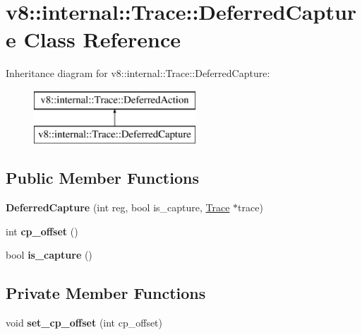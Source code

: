 \hypertarget{classv8_1_1internal_1_1_trace_1_1_deferred_capture}{}\section{v8\+:\+:internal\+:\+:Trace\+:\+:Deferred\+Capture Class Reference}
\label{classv8_1_1internal_1_1_trace_1_1_deferred_capture}
Inheritance diagram for v8\+:\+:internal\+:\+:Trace\+:\+:Deferred\+Capture\+:\begin{figure}[H]
\begin{center}
\leavevmode
\includegraphics[height=2.000000cm]{classv8_1_1internal_1_1_trace_1_1_deferred_capture}
\end{center}
\end{figure}
\subsection*{Public Member Functions}
\begin{DoxyCompactItemize}
\item 
{\bfseries Deferred\+Capture} (int reg, bool is\+\_\+capture, \hyperlink{classv8_1_1internal_1_1_trace}{Trace} $\ast$trace)\hypertarget{classv8_1_1internal_1_1_trace_1_1_deferred_capture_a20de459c31ae73a99b96e89a0364337f}{}\label{classv8_1_1internal_1_1_trace_1_1_deferred_capture_a20de459c31ae73a99b96e89a0364337f}

\item 
int {\bfseries cp\+\_\+offset} ()\hypertarget{classv8_1_1internal_1_1_trace_1_1_deferred_capture_ada13388019075f6a61a6da2cdfb617ad}{}\label{classv8_1_1internal_1_1_trace_1_1_deferred_capture_ada13388019075f6a61a6da2cdfb617ad}

\item 
bool {\bfseries is\+\_\+capture} ()\hypertarget{classv8_1_1internal_1_1_trace_1_1_deferred_capture_aad6bc18b74d133664b9eb67212ec8f0f}{}\label{classv8_1_1internal_1_1_trace_1_1_deferred_capture_aad6bc18b74d133664b9eb67212ec8f0f}

\end{DoxyCompactItemize}
\subsection*{Private Member Functions}
\begin{DoxyCompactItemize}
\item 
void {\bfseries set\+\_\+cp\+\_\+offset} (int cp\+\_\+offset)\hypertarget{classv8_1_1internal_1_1_trace_1_1_deferred_capture_ad3e906cb35111f2a1816661d7eb46648}{}\label{classv8_1_1internal_1_1_trace_1_1_deferred_capture_ad3e906cb35111f2a1816661d7eb46648}

\end{DoxyCompactItemize}
